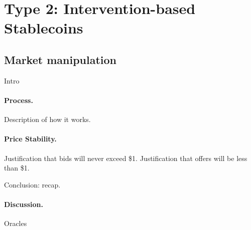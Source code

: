 


\section{Type 2: Intervention-based Stablecoins}
\label{sec:t2}




\subsection{Market manipulation}
\label{sec:board}

Intro

\paragraph{Process.} Description of how it works.

\paragraph{Price Stability.} Justification that bids will never exceed \$1. Justification that offers will be less than \$1.

Conclusion: recap.

\paragraph{Discussion.} Oracles


